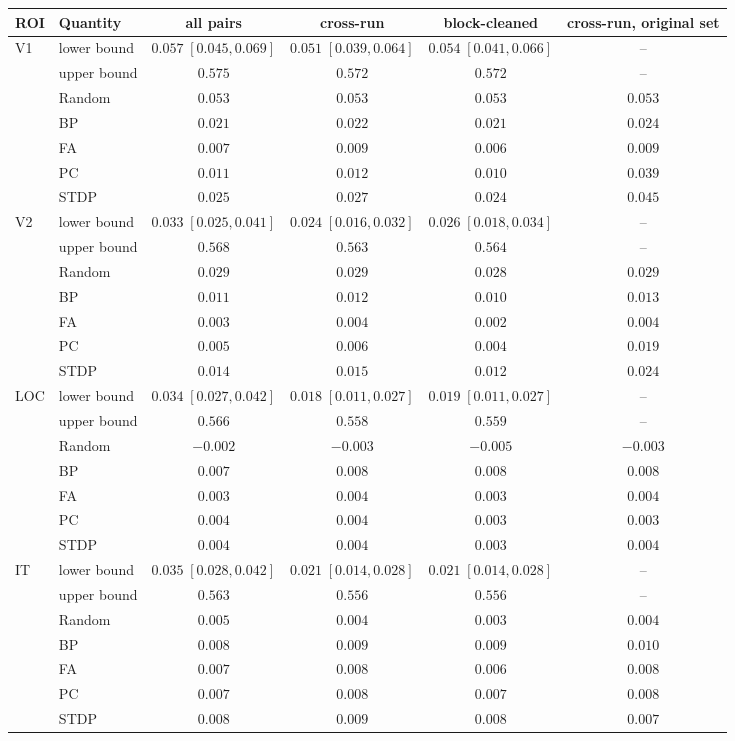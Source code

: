 \begin{tabular}{llcccc}
\toprule
ROI & Quantity & all pairs & cross-run & block-cleaned & cross-run, original set \\
\midrule
V1 & lower bound & $0.057\;[0.045,0.069]$ & $0.051\;[0.039,0.064]$ & $0.054\;[0.041,0.066]$ & -- \\
 & upper bound & $0.575$ & $0.572$ & $0.572$ & -- \\
 & Random & $0.053$ & $0.053$ & $0.053$ & $0.053$ \\
 & BP & $0.021$ & $0.022$ & $0.021$ & $0.024$ \\
 & FA & $0.007$ & $0.009$ & $0.006$ & $0.009$ \\
 & PC & $0.011$ & $0.012$ & $0.010$ & $0.039$ \\
 & STDP & $0.025$ & $0.027$ & $0.024$ & $0.045$ \\
\addlinespace
V2 & lower bound & $0.033\;[0.025,0.041]$ & $0.024\;[0.016,0.032]$ & $0.026\;[0.018,0.034]$ & -- \\
 & upper bound & $0.568$ & $0.563$ & $0.564$ & -- \\
 & Random & $0.029$ & $0.029$ & $0.028$ & $0.029$ \\
 & BP & $0.011$ & $0.012$ & $0.010$ & $0.013$ \\
 & FA & $0.003$ & $0.004$ & $0.002$ & $0.004$ \\
 & PC & $0.005$ & $0.006$ & $0.004$ & $0.019$ \\
 & STDP & $0.014$ & $0.015$ & $0.012$ & $0.024$ \\
\addlinespace
LOC & lower bound & $0.034\;[0.027,0.042]$ & $0.018\;[0.011,0.027]$ & $0.019\;[0.011,0.027]$ & -- \\
 & upper bound & $0.566$ & $0.558$ & $0.559$ & -- \\
 & Random & $-0.002$ & $-0.003$ & $-0.005$ & $-0.003$ \\
 & BP & $0.007$ & $0.008$ & $0.008$ & $0.008$ \\
 & FA & $0.003$ & $0.004$ & $0.003$ & $0.004$ \\
 & PC & $0.004$ & $0.004$ & $0.003$ & $0.003$ \\
 & STDP & $0.004$ & $0.004$ & $0.003$ & $0.004$ \\
\addlinespace
IT & lower bound & $0.035\;[0.028,0.042]$ & $0.021\;[0.014,0.028]$ & $0.021\;[0.014,0.028]$ & -- \\
 & upper bound & $0.563$ & $0.556$ & $0.556$ & -- \\
 & Random & $0.005$ & $0.004$ & $0.003$ & $0.004$ \\
 & BP & $0.008$ & $0.009$ & $0.009$ & $0.010$ \\
 & FA & $0.007$ & $0.008$ & $0.006$ & $0.008$ \\
 & PC & $0.007$ & $0.008$ & $0.007$ & $0.008$ \\
 & STDP & $0.008$ & $0.009$ & $0.008$ & $0.007$ \\
\bottomrule
\end{tabular}
